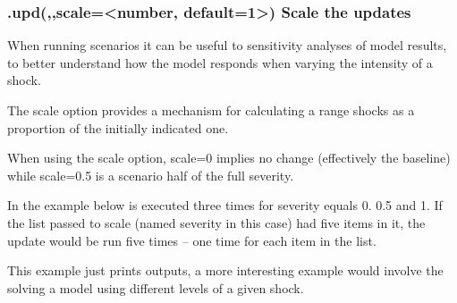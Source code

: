 \documentclass[letterpaper,10pt,english]{jupyterBook}
\begin{document}
\subsubsection{.upd(,,scale=<number, default=1>) Scale the updates}
\label{\detokenize{content/04_PythonEssentials/UpdateCommand:upd-scale-number-default-1-scale-the-updates}}
\sphinxAtStartPar
When running scenarios it can be useful to sensitivity analyses of model results, to better understand how the model responds when varying the intensity of a shock.

\sphinxAtStartPar
The scale option provides a mechanism for calculating a range shocks as a proportion of the initially indicated one.

\sphinxAtStartPar
When using the scale option, scale=0 implies no change (effectively the baseline) while scale=0.5 is a scenario half of the full severity.

\sphinxAtStartPar
In the example below  is executed three times for severity equals 0. 0.5 and 1.  If the list passed to scale (named severity in this case) had five items in it, the update would be run five times – one time for each item in the list.

\sphinxAtStartPar
This example just prints outputs, a more interesting example would involve the solving a model using different levels of a given shock.
\end{document}
